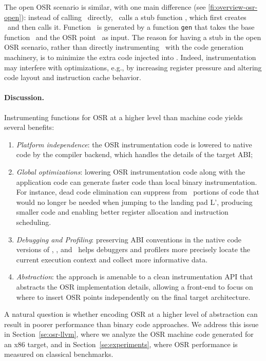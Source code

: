 The open OSR scenario is similar, with one main difference (see \ref{fi:overview-osr-open}): instead of calling \fosrto\ directly, \fosrfrom\ calls a stub function \fstub, which first creates \fosrto\ and then calls it. Function \fosrto\ is generated by a function {\tt gen} that takes the base function \fbase\ and the OSR point \osrpoint\ as input. The reason for having a stub in the open OSR scenario, rather than directly instrumenting \fbase\ with the code generation machinery, is to minimize the extra code injected into \fbase. Indeed, instrumentation may interfere with optimizations, e.g., by increasing register pressure and altering code layout and instruction cache behavior.


\paragraph{Discussion.}
Instrumenting functions for OSR at a higher level than machine code yields several benefits: 
\begin{enumerate}
\item {\em Platform independence}: the OSR instrumentation code is lowered to native code by the compiler backend, which handles the details of the target ABI; 
\item {\em Global optimizations}: lowering OSR instrumentation code along with the application code can generate faster code than local binary instrumentation. For instance, dead code elimination can suppress from \fosrto\ portions of code that would no longer be needed when jumping to the landing pad \textsf{L'}, producing smaller code and enabling better register allocation and instruction scheduling.
\item {\em Debugging and Profiling}: preserving ABI conventions in the native code versions of \fosrfrom, \fstub, and \fosrto\ helps debuggers and profilers more precisely locate the current execution context and collect more informative data.
\item {\em Abstraction}: the approach is amenable to a clean instrumentation API that abstracts the OSR implementation details, allowing a front-end to focus on where to insert OSR points independently on the final target architecture.
\end{enumerate}

\noindent A natural question is whether encoding OSR at a higher level of abstraction can result in poorer performance than binary code approaches. We address this issue in Section~\ref{se:osr-llvm}, where we analyze the OSR machine code generated for an x86 target, and in Section~\ref{se:experiments}, where OSR performance is measured on classical benchmarks.

